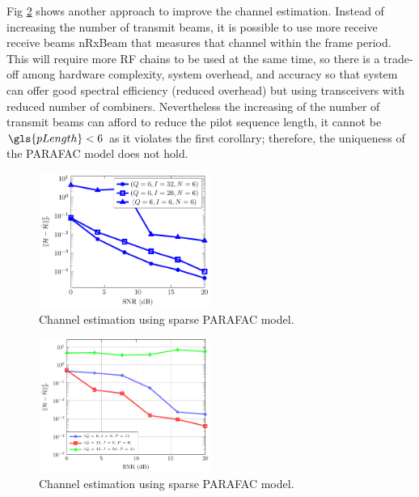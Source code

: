 \documentclass[conference]{IEEEtran}
\begin{document}
Fig \ref{fig:rx_beams} shows another approach to improve the channel estimation. Instead
of increasing the number of transmit beams, it is possible to use more receive
receive beams \gls{nRxBeam} that measures that channel within the frame period. This will require more \gls{RF} chains to be used at the same time, so there
is a trade-off among hardware complexity, system overhead, and accuracy so that
system can offer good spectral efficiency (reduced overhead) but using
transceivers with reduced number of combiners. Nevertheless the increasing of
the number of transmit beams can afford to reduce the pilot sequence length, it cannot be $\gls{pLength}<6$ as it violates the
first corollary; therefore, the uniqueness of the \gls{PARAFAC} model does not hold. 


\begin{figure}[!t]
  \centering
  \includegraphics[width=0.5\textwidth]{fig/snr_nmse}
  \caption{Channel estimation using sparse PARAFAC model. }
  \label{fig:tx_beams}
\end{figure}

\begin{figure}[!t]
  \centering
  \includegraphics[width=0.5\textwidth]{fig/snr_nmse_rx}
  \caption{Channel estimation using sparse PARAFAC model. }
  \label{fig:rx_beams}
\end{figure}
\end{document}
